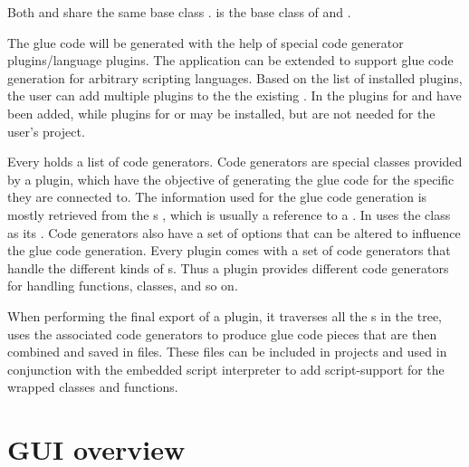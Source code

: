 Both  and  share the same base class .  is the base class of  and .

The glue code will be generated with the help of special code generator plugins/language plugins. The application can be extended to support glue code generation for arbitrary scripting languages. Based on the list of installed plugins, the user can add multiple plugins to the the existing . In  the plugins for  and  have been added, while plugins for  or  may be installed, but are not needed for the user's project.

Every  holds a list of code generators. Code generators are special classes provided by a plugin, which have the objective of generating the glue code for the specific  they are connected to. The information used for the glue code generation is mostly retrieved from the s , which is usually a reference to a . In   uses the  class  as its . Code generators also have a set of options that can be altered to influence the glue code generation.
Every plugin comes with a set of code generators that handle the different kinds of s. Thus a plugin provides different code generators for handling functions, classes, and so on. 

When performing the final export of a plugin, it traverses all the s in the tree, uses the associated code generators to produce glue code pieces that are then combined and saved in files. These files can be included in  projects and used in conjunction with the embedded script interpreter to add script-support for the wrapped classes and functions.

\newpage
\section{GUI overview}

